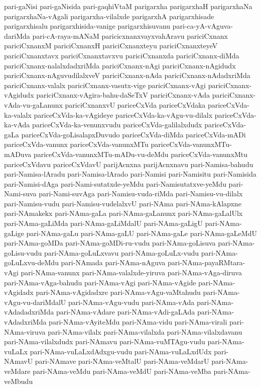 {pari-gaNisi
pari-gaNisida
pari-gaqhiVtaM
parigarxha
parigarxhaH
parigarxhaNa
parigarxhaNa-vAgali
parigarxha-vilalxde
parigarxhA
parigarxhisade
parigarxhisalu
parigarxhisida-vanige
parigarxhisuvanu
pari-ca-yA-vAguva-dariMda
pari-cA-raya-mANaM
paricicxnanxvayxvahAravu
pariciCxnanx
pariciCxnanxM
pariciCxnanxH
pariciCxnanxteyu
pariciCxnanxteyeV
pariciCxnanxtavx
pariciCxnanxtavxvu
pariciCxnanxda
pariciCxnanx-diMda
pariciCxnanx-nalalxdadxriMda
pariciCxnanx-nAgi
pariciCxnanx-nAgidudx
pariciCxnanx-nAguvudilalxveV
pariciCxnanx-nAda
pariciCxnanx-nAdadxriMda
pariciCxnanx-valalx
pariciCxnanx-vasutx-vige
pariciCxnanx-vAgi
pariciCxnanx-vAgidudx
pariciCxnanx-vAgira-bahu-daSeTxV
pariciCxnanx-vAda
pariciCxnanx-vAda-vu-gaLanunx
pariciCxnanxvU
pariceCxVda
pariceCxVdaka
pariceCxVda-ka-valalx
pariceCxVda-ka-vAgideye
pariceCxVda-ka-vAgu-vu-dilalx
pariceCxVda-ka-vAda
pariceCxVda-ka-venunxvudu
pariceCxVda-galilalxdudx
pariceCxVda-gaLa
pariceCxVda-goLisalapxDuvudo
pariceCxVda-diMda
pariceCxVda-mADi
pariceCxVda-vanunx
pariceCxVda-vanunxMTu
pariceCxVda-vanunxMTu-mADuva
pariceCxVda-vanunxMTu-mADu-vu-deMdu
pariceCxVda-vanunxMtu
pariceCxVdavu
pariceCxVdavU
parijAcnxna
parijAcnxnavu
pari-Namisa-bahudu
pari-Namisa-lAradu
pari-Namisa-lArado
pari-Namisi
pari-Namisitu
pari-Namisida
pari-Namisi-dAga
pari-Nami-sutatxde-yeMdu
pari-Namisutatxve-yeMdu
pari-Nami-suva
pari-Nami-suvAga
pari-Namisu-vuda-riMda
pari-Namisu-vu-dilalx
pari-Namisu-vudu
pari-Namisu-vudelalxvU
pari-NAma
pari-NAma-kAlapxne
pari-NAmakekx
pari-NAma-gaLa
pari-NAma-gaLanunx
pari-NAma-gaLalUlx
pari-NAma-gaLiMda
pari-NAma-gaLiMdalU
pari-NAma-gaLigU
pari-NAma-gaLige
pari-NAma-gaLu
pari-NAma-gaLU
pari-NAma-gaLe
pari-NAma-gaLeMdU
pari-NAma-goMDa
pari-NAma-goMDi-ru-vudu
pari-NAma-goLisuva
pari-NAma-goLisu-vudu
pari-NAma-goLuLxvavu
pari-NAma-goLuLx-vudu
pari-NAma-goLuLxvu-deMdu
pari-NAmada
pari-NAma-nAguva
pari-NAma-payaRMtara-vAgi
pari-NAma-vanunx
pari-NAma-valalxde-yiruva
pari-NAma-vAga-diruva
pari-NAma-vAga-bahudu
pari-NAma-vAgi
pari-NAma-vAgide
pari-NAma-vAgidadx
pari-NAma-vAgidadxre
pari-NAma-vAgu-vaMtahudu
pari-NAma-vAgu-vu-dariMdalU
pari-NAma-vAgu-vudu
pari-NAma-vAda
pari-NAma-vAdadadxriMda
pari-NAma-vAdare
pari-NAma-vAdi-gaLAda
pari-NAma-vAdadxriMda
pari-NAma-vAyiteMdu
pari-NAma-vidu
pari-NAma-virali
pari-NAma-viruva
pari-NAma-vilalx
pari-NAma-vilalxda
pari-NAma-vilalxdavanu
pari-NAma-vilalxdudx
pari-NAmavu
pari-NAma-vuMTAgu-vudu
pari-NAma-vuLaLx
pari-NAma-vuLaLxdAdxgu-vudu
pari-NAma-vuLaLxdUdx
pari-NAmavU
pari-NAmave
pari-NAma-veMtalU
pari-NAma-veMdarU
pari-NAma-veMdare
pari-NAma-veMdu
pari-NAma-veMdU
pari-NAma-veMba
pari-NAma-veMbudu
}
